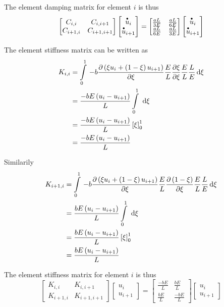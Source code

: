 The element damping matrix for element $i$ is thus
\begin{equation}
  \begin{bmatrix}
    C_{i,i} & C_{i,i+1} \\
    C_{i+1,i} & C_{i+1,i+1}
  \end{bmatrix}\begin{bmatrix}
     \stackrel{\scriptscriptstyle \bullet}{u} _{i} \\
     \stackrel{\scriptscriptstyle \bullet}{u} _{i+1}
  \end{bmatrix} = \begin{bmatrix}
    \frac{aL}{3E} & \frac{aL}{6E} \\
    \frac{aL}{6E} & \frac{aL}{3E}
   \end{bmatrix}\begin{bmatrix}
     \stackrel{\scriptscriptstyle \bullet}{u} _{i} \\
     \stackrel{\scriptscriptstyle \bullet}{u} _{i+1}
  \end{bmatrix}
\end{equation}

The element stiffness matrix can be written as
\begin{align}
  K_{i,i}&=\gint{0}{1}{-b\delby{\pbrac{\xi u_{i}+\pbrac{1-\xi}u_{i+1}}}{\xi}\dfrac{E}{L}\delby{\xi}{\xi}\dfrac{E}{L}\dfrac{L}{E}}{\xi} \\
  &=\dfrac{-bE\pbrac{u_{i}-u_{i+1}}}{L}\gint{0}{1}{}{\xi}\\
  &=\dfrac{-bE\pbrac{u_{i}-u_{i+1}}}{L}\sqbrac{\xi}_{0}^{1}\\
  &=\dfrac{-bE\pbrac{u_{i}-u_{i+1}}}{L}
\end{align}

Similarily
\begin{align}
  K_{i+1,i}&=\gint{0}{1}{-b\delby{\pbrac{\xi u_{i}+\pbrac{1-\xi}u_{i+1}}}{\xi}\dfrac{E}{L}\delby{\pbrac{1-\xi}}{\xi}\dfrac{E}{L}\dfrac{L}{E}}{\xi} \\
  &=\dfrac{bE\pbrac{u_{i}-u_{i+1}}}{L}\gint{0}{1}{}{\xi}\\
  &=\dfrac{bE\pbrac{u_{i}-u_{i+1}}}{L}\sqbrac{\xi}_{0}^{1}\\
  &=\dfrac{bE\pbrac{u_{i}-u_{i+1}}}{L}
\end{align}


The element stiffness matrix for element $i$ is thus
\begin{equation}
  \begin{bmatrix}
    K_{i,i} & K_{i,i+1} \\
    K_{i+1,i} & K_{i+1,i+1}
  \end{bmatrix}\begin{bmatrix}
    u_{i} \\
    u_{i+1}
  \end{bmatrix} = \begin{bmatrix}
    \frac{-bE}{L} & \frac{bE}{L} \\
    \frac{bE}{L} & \frac{-bE}{L}
   \end{bmatrix}\begin{bmatrix}
    u_{i} \\
    u_{i+1}
  \end{bmatrix}
\end{equation}

